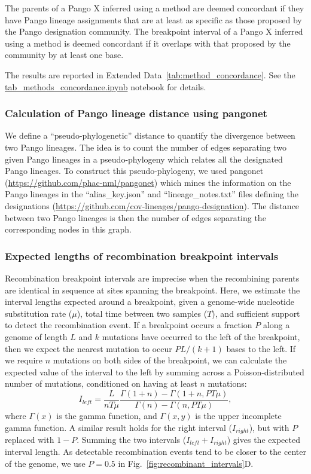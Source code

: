 \documentclass[12pt]{article}
\newcommand{\figref}[1]{Fig.~\ref{#1}}
\newcommand{\edref}[1]{Extended Data~\ref{#1}}
\begin{document}
The parents of a Pango X inferred using a method are deemed concordant
if they have Pango lineage assignments
that are at least as specific as those proposed by the Pango designation community.
The breakpoint interval of a Pango X inferred using a method is deemed concordant
if it overlaps with that proposed by the community by at least one base.

The results are reported in \edref{tab:method_concordance}.
See the
\href{https://github.com/jeromekelleher/sc2ts-paper/blob/main/notebooks/tab\_methods\_concordance.ipynb}{tab\_methods\_concordance.ipynb}
notebook for details.

\subsubsection*{Calculation of Pango lineage distance using pangonet}

We define a ``pseudo-phylogenetic'' distance
to quantify the divergence between two Pango lineages.
The idea is to count the number of edges
separating two given Pango lineages in a pseudo-phylogeny
which relates all the designated Pango lineages.
To construct this pseudo-phylogeny, we used
pangonet (\url{https://github.com/phac-nml/pangonet})
which mines the information on the Pango lineages
in the ``alias\_key.json'' and ``lineage\_notes.txt'' files
defining the designations
(\url{https://github.com/cov-lineages/pango-designation}).
The distance between two Pango lineages is then the number of edges
separating the corresponding nodes in this graph.

\subsubsection*{Expected lengths of recombination breakpoint intervals}

Recombination breakpoint intervals are imprecise
when the recombining parents are identical in sequence
at sites spanning the breakpoint.
Here, we estimate the interval lengths expected around a breakpoint,
given a genome-wide nucleotide substitution rate ($\mu$),
total time between two samples ($T$), and
sufficient support to detect the recombination event.
If a breakpoint occurs a fraction $P$
along a genome of length $L$ and
$k$ mutations have occurred to the left of the breakpoint,
then we expect the nearest mutation
to occur $P L / (k + 1)$ bases to the left.
If we require $n$ mutations on both sides of the breakpoint,
we can calculate the expected value of the interval to the left
by summing across a Poisson-distributed number of mutations,
conditioned on having at least $n$ mutations:
\[
I_{left} = \frac{L}{n T \mu} \frac{\Gamma(1+n) - \Gamma(1+n, P T \mu)}{
\Gamma(n) - \Gamma(n, P T \mu)},
\]
where $\Gamma(x)$ is the gamma function, and
$\Gamma(x, y)$ is the upper incomplete gamma function.
A similar result holds for the right interval ($I_{right}$),
but with $P$ replaced with $1-P$.
Summing the two intervals ($I_{left}+I_{right}$)
gives the expected interval length.
As detectable recombination events
tend to be closer to the center of the genome,
we use $P=0.5$ in \figref{fig:recombinant_intervals}D.
\end{document}
